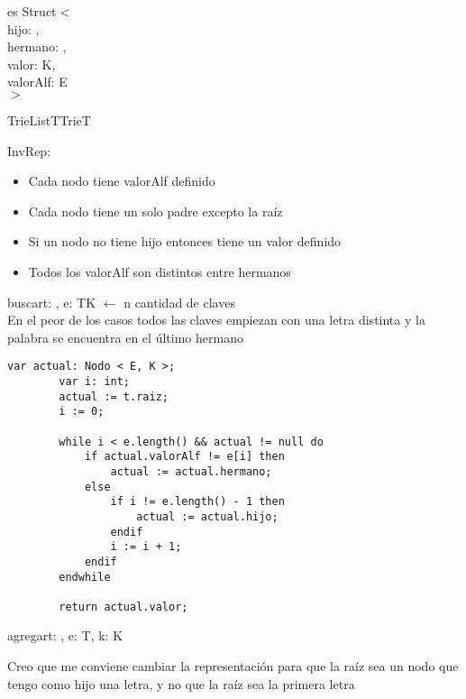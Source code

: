 \nodoTrie es Struct$<$\\
\Indent\Indent hijo: \nodoTrie,\\
\Indent\Indent hermano: \nodoTrie,\\
\Indent\Indent valor: K,\\
\Indent\Indent valorAlf: E\\
\Indent$>$

\begin{module}{TrieList}{T}{Trie}{T}

	\medskip
	InvRep:
	\begin{itemize}
		\item Cada nodo tiene valorAlf definido
		\item Cada nodo tiene un solo padre excepto la raíz
		\item Si un nodo no tiene hijo entonces tiene un valor definido
		\item Todos los valorAlf son distintos entre hermanos
	\end{itemize}

	\begin{proc}{buscar}{\In t: \moduletype, \In e: T}{K}
		 $\leftarrow$ n cantidad de claves\\
		En el peor de los casos todos las claves empiezan con una letra distinta y la palabra se encuentra en el último hermano
		\begin{lstlisting}[numbers=none,frame=none]
		var actual: Nodo < E, K >;
		var i: int;
		actual := t.raiz;
		i := 0;

		while i < e.length() && actual != null do
			if actual.valorAlf != e[i] then
				actual := actual.hermano;
			else
				if i != e.length() - 1 then
					actual := actual.hijo;
				endif
				i := i + 1;
			endif
		endwhile

		return actual.valor;
		\end{lstlisting}
	\end{proc}

	\begin{proc}{agregar}{\Inout t: \moduletype, \In e: T, \In k: K}{}
		\hacer

		Creo que me conviene cambiar la representación para que la raíz sea un nodo que tengo como hijo una letra, y no que la raíz sea la primera letra
	\end{proc}
\end{module}

